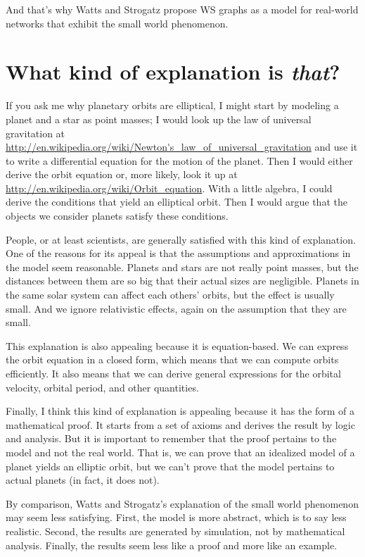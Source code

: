 \documentclass[12pt]{book}
\theoremstyle{exercise}
\begin{document}
And that's why Watts and Strogatz propose WS graphs as a
model for real-world networks that exhibit the small world phenomenon.


\section{What kind of explanation is {\em that}?}

If you ask me why planetary orbits are elliptical,
I might start by modeling a planet and a star as point masses; I
would look up the law of universal gravitation at
\url{http://en.wikipedia.org/wiki/Newton's_law_of_universal_gravitation}
and use it to write a differential equation for the motion of
the planet.  Then I would either derive the orbit equation or,
more likely, look it up at \url{http://en.wikipedia.org/wiki/Orbit_equation}.
With a little algebra, I could derive the conditions that
yield an elliptical orbit.  Then I would argue that the objects
we consider planets satisfy these conditions.

People, or at least scientists, are generally satisfied with
this kind of explanation.  One of the reasons for its appeal
is that the assumptions and approximations in the model seem
reasonable.  Planets and stars are not really point masses,
but the distances between them are so big that their actual
sizes are negligible.  Planets in the same solar system can
affect each others' orbits, but the effect is usually small.
And we ignore relativistic effects, again on the assumption that
they are small.

This explanation is also appealing because it is equation-based.
We can express the orbit equation in a closed form, which means
that we can compute orbits efficiently.  It also means that
we can derive general expressions for the orbital velocity,
orbital period, and other quantities.

Finally, I think this kind of explanation is appealing because
it has the form of a mathematical proof.  It starts from a
set of axioms and derives the result by logic and analysis.
But it is important to remember that the proof pertains to the
model and not the real world.  That is, we can prove that
an idealized model of a planet yields an elliptic orbit, but
we can't prove that the model pertains to actual planets (in
fact, it does not).

By comparison, Watts and Strogatz's explanation of the small
world phenomenon may seem less satisfying.  First, the model
is more abstract, which is to say less realistic.  Second,
the results are generated by simulation, not by mathematical
analysis.  Finally, the results seem less like a proof and
more like an example.
\end{document}
